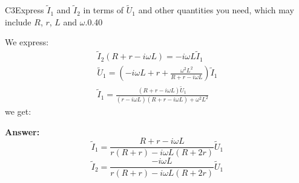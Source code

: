 \documentclass[11pt,a4paper]{article}
\begin{document}
\begin{solcard}{C3}{Express $\tilde I_1$ and $\tilde I_2$ in terms of $\tilde U_1$ and other quantities you need, which may include $R$, $r$, $L$ and $\omega$.}{0.40}

We express: 
\[
\begin{gathered} \tilde{I}_2(R+r-i \omega L)=-i \omega L \tilde{I}_1 \\ \tilde{U}_1=\left(-i \omega L+r+\frac{\omega^2 L^2}{R+r-i \omega L}\right) \tilde{I}_1 \\ \tilde{I}_1=\frac{(R+r-i \omega L) \tilde{U}_1}{(r-i \omega L)(R+r-i \omega L)+\omega^2 L^2} \end{gathered}
\]
 we get:

\par\smallskip\noindent\textbf{Answer:} $$\tilde{I}_1=\frac{R+r-i \omega L}{r(R+r)-i \omega L(R+2 r)} \tilde{U}_1 $$$$ \tilde{I}_2=\frac{-i \omega L}{r(R+r)-i \omega L(R+2 r)} \tilde{U}_1$$
\end{solcard}
\end{document}

